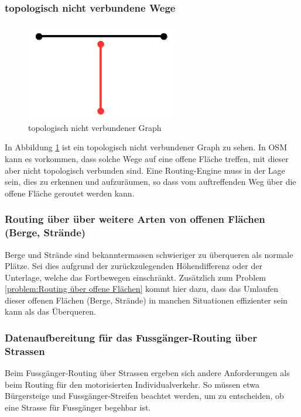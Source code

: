 \subsubsection{topologisch nicht verbundene Wege}
\label{problem:topologisch nicht verbundene Wege}

\begin{figure}[ht]
\centering
\includegraphics[width=0.5\linewidth]{technicalreport/img/topologisch_nicht_verbundener_graph}
\caption[topologisch nicht verbundener Graph]{topologisch nicht verbundener Graph}
\label{fig:topologisch_nicht_verbundener_graph}
\end{figure}

In Abbildung \ref{fig:topologisch_nicht_verbundener_graph} ist ein topologisch nicht verbundener Graph zu sehen. In \ac{OSM} kann es vorkommen, dass solche Wege auf eine offene Fläche treffen, mit dieser aber nicht topologisch verbunden sind. Eine Routing-Engine muss in der Lage sein, dies zu erkennen und aufzuräumen, so dass vom auftreffenden Weg über die offene Fläche geroutet werden kann.

\subsubsection{Routing über über weitere Arten von offenen Flächen (Berge, Strände)}
\label{problem:Routing über über weitere Arten von offenen Flächen (Berge, Strände)}
Berge und Strände sind bekanntermassen schwieriger zu überqueren als normale Plätze. Sei dies aufgrund der zurückzulegenden Höhendifferenz oder der Unterlage, welche das Fortbewegen einschränkt. Zusätzlich zum Problem \ref{problem:Routing über offene Flächen} kommt hier dazu, dass das Umlaufen dieser offenen Flächen (Berge, Strände) in manchen Situationen effizienter sein kann als das Überqueren.

\subsubsection{Datenaufbereitung für das Fussgänger-Routing über Strassen}
\label{problem:Datenaufbereitung für das Fussgänger-Routing über Strassen}
Beim Fussgänger-Routing über Strassen ergeben sich andere Anforderungen als beim Routing für den motorisierten Individualverkehr. So müssen etwa Bürgersteige und Fussgänger-Streifen beachtet werden, um zu entscheiden, ob eine Strasse für Fussgänger begehbar ist.


